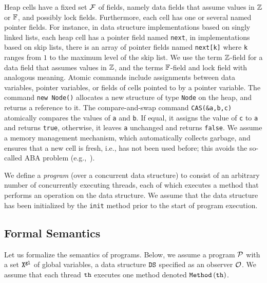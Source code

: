 %
Heap cells have a fixed set $\mathcal{F}$ of fields, namely
data fields that assume values in
${\mathbb Z}$ or $\mathbb{F}$, and possibly lock fields.
Furthermore, each cell has one or several named pointer fields.
For instance, in data structure implementations based on singly linked lists,
each heap cell has a pointer field named {\tt next}, in implementations
based on skip lists, there is an array of pointer fields named
{\tt next[k]} where {\tt k} ranges from $1$ to the maximum level of the
skip list.
We use the term ${\mathbb Z}$-field for a data field that
assumes values in ${\mathbb Z}$, and the terms $\mathbb{F}$-field and lock field
with analogous meaning.
Atomic commands include assignments between data variables, 
pointer variables, or fields of cells pointed to by a pointer variable.
%
The command {\tt new Node()} allocates a new structure of type
{\tt Node} on the heap, and returns a reference to it.
%
The compare-and-swap command {\tt CAS(\&a,b,c)} atomically
compares the values of {\tt a} and {\tt b}.
If  equal, it assigns the value of
{\tt c} to {\tt a}  and returns {\tt true}, 
otherwise, it leaves {\tt a} unchanged and returns {\tt false}. 
%
We assume a memory management mechanism, which automatically collects
garbage, and ensures that a new cell is fresh, i.e., has
not been used before; this avoids the so-called
ABA problem (e.g.,~\cite{MS:QueueAlgorithms}).

We define a {\em program} (over a concurrent data structure) to consist 
of an arbitrary number of concurrently executing threads, each of which
executes a method that performs an operation
on the data structure. We assume that the data structure has been initialized
by the {\tt init} method prior to the start of program execution.

\subsection{Formal Semantics}
\label{semantics:section}
Let us formalize the semantics of programs.
Below, we assume a program ${\mathcal P}$  with a set 
${\tt X}^{\tt gl}$ of global variables,
a data structure ${\tt DS}$ specified as an observer ${\mathcal O}$.
%
We assume that each thread ${\tt th}$ executes one method
denoted ${\tt Method}\left({\tt th}\right)$.

